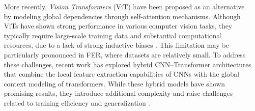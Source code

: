 More recently, \textit{Vision Transformers} (ViT) have been proposed as an alternative by modeling global dependencies through self-attention mechanisms. Although ViTs have shown strong performance in various computer vision tasks, they typically require large-scale training data and substantial computational resources, due to a lack of strong inductive biases \cite{dosovitskiy2021vit}. This limitation may be particularly pronounced in FER, where datasets are relatively small. To address these challenges, recent work has explored hybrid CNN–Transformer architectures that combine the local feature extraction capabilities of CNNs with the global context modeling of transformers. While these hybrid models have shown promising results, they introduce additional complexity and raise challenges related to training efficiency and generalization \cite{Haruna_2025, Wu2021convvit}.

